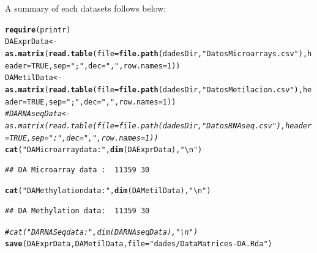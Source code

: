 \documentclass[a4paper,10pt]{article}\usepackage[]{graphicx}\usepackage[]{color}
\makeatletter
\newcommand{\hlnum}[1]{\textcolor[rgb]{0.686,0.059,0.569}{#1}}%
\newcommand{\hlstr}[1]{\textcolor[rgb]{0.192,0.494,0.8}{#1}}%
\newcommand{\hlcom}[1]{\textcolor[rgb]{0.678,0.584,0.686}{\textit{#1}}}%
\newcommand{\hlstd}[1]{\textcolor[rgb]{0.345,0.345,0.345}{#1}}%
\newcommand{\hlkwb}[1]{\textcolor[rgb]{0.69,0.353,0.396}{#1}}%
\newcommand{\hlkwc}[1]{\textcolor[rgb]{0.333,0.667,0.333}{#1}}%
\newcommand{\hlkwd}[1]{\textcolor[rgb]{0.737,0.353,0.396}{\textbf{#1}}}%
\newenvironment{kframe}{%
 \def\at@end@of@kframe{}%
 \ifinner\ifhmode%
  \def\at@end@of@kframe{\end{minipage}}%
  \begin{minipage}{\columnwidth}%
 \fi\fi%
 \def\FrameCommand##1{\hskip\@totalleftmargin \hskip-\fboxsep
 \colorbox{shadecolor}{##1}\hskip-\fboxsep
     \hskip-\linewidth \hskip-\@totalleftmargin \hskip\columnwidth}%
 \MakeFramed {\advance\hsize-\width
   \@totalleftmargin\z@ \linewidth\hsize
   \@setminipage}}%
 {\par\unskip\endMakeFramed%
 \at@end@of@kframe}
\newenvironment{knitrout}{}{} %
\makeatother
\begin{document}
A summary of each datasets follows below:

\begin{knitrout}
\color{fgcolor}\begin{kframe}
\begin{alltt}
\hlkwd{require}\hlstd{(printr)}
\hlstd{DAExprData} \hlkwb{<-} \hlkwd{as.matrix}\hlstd{(}\hlkwd{read.table}\hlstd{(}\hlkwc{file}\hlstd{=}\hlkwd{file.path}\hlstd{(dadesDir,}\hlstr{"DatosMicroarrays.csv"}\hlstd{),} \hlkwc{header}\hlstd{=}\hlnum{TRUE}\hlstd{,} \hlkwc{sep}\hlstd{=}\hlstr{";"}\hlstd{,} \hlkwc{dec}\hlstd{=}\hlstr{","}\hlstd{,} \hlkwc{row.names} \hlstd{=} \hlnum{1}\hlstd{))}
\hlstd{DAMetilData} \hlkwb{<-} \hlkwd{as.matrix}\hlstd{(}\hlkwd{read.table}\hlstd{(}\hlkwc{file}\hlstd{=}\hlkwd{file.path}\hlstd{(dadesDir,}\hlstr{"DatosMetilacion.csv"}\hlstd{),} \hlkwc{header}\hlstd{=}\hlnum{TRUE}\hlstd{,} \hlkwc{sep}\hlstd{=}\hlstr{";"}\hlstd{,}\hlkwc{dec}\hlstd{=}\hlstr{","}\hlstd{,} \hlkwc{row.names} \hlstd{=} \hlnum{1}\hlstd{))}
\hlcom{#DARNAseqData <- as.matrix(read.table(file=file.path(dadesDir,"DatosRNAseq.csv"), header=TRUE, sep=";",dec=",", row.names = 1))}
\hlkwd{cat}\hlstd{(}\hlstr{"DA Microarray data : "}\hlstd{,} \hlkwd{dim}\hlstd{(DAExprData),} \hlstr{"\textbackslash{}n"}\hlstd{)}
\end{alltt}
\begin{verbatim}
## DA Microarray data :  11359 30
\end{verbatim}
\begin{alltt}
\hlkwd{cat}\hlstd{(}\hlstr{"DA Methylation data: "}\hlstd{,} \hlkwd{dim}\hlstd{(DAMetilData),} \hlstr{"\textbackslash{}n"}\hlstd{)}
\end{alltt}
\begin{verbatim}
## DA Methylation data:  11359 30
\end{verbatim}
\begin{alltt}
\hlcom{# cat("DA RNASeq data     : ", dim(DARNAseqData), "\textbackslash{}n")}
\hlkwd{save}\hlstd{(DAExprData, DAMetilData,} \hlkwc{file}\hlstd{=}\hlstr{"dades/DataMatrices-DA.Rda"}\hlstd{)}
\end{alltt}
\end{kframe}
\end{knitrout}
\end{document}
